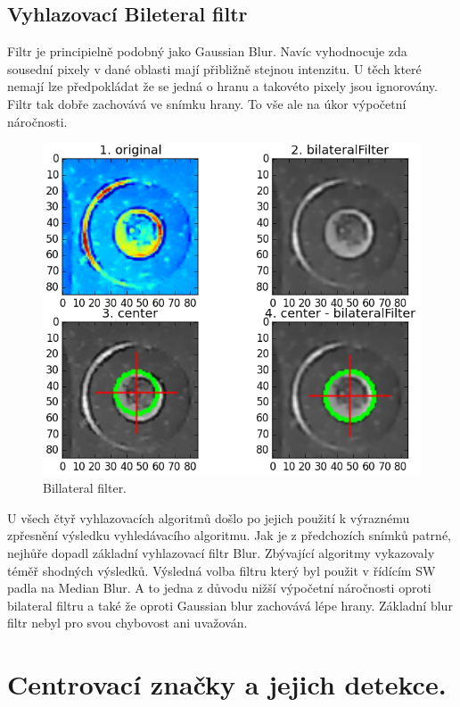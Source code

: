 \subsection{Vyhlazovací Bileteral filtr}

Filtr je principielně podobný jako Gaussian Blur. Navíc vyhodnocuje zda sousední pixely v dané oblasti mají přibližně stejnou intenzitu. U těch které nemají lze předpokládat že se jedná o hranu a takovéto pixely jsou ignorovány. Filtr tak dobře zachovává ve snímku hrany. To vše ale na úkor výpočetní náročnosti.

\begin{figure}[h!]
  \centering
    \includegraphics[width=0.8\linewidth]{obrazky/billateralFilter.png}%
    \caption{Billateral filter.}
    \label{fig:billateralfilter}
\end{figure}

U všech čtyř vyhlazovacích algoritmů došlo po jejich použití k výraznému zpřesnění výsledku vyhledávacího algoritmu. Jak je z předchozích snímků patrné, nejhůře dopadl základní vyhlazovací filtr Blur. Zbývající algoritmy vykazovaly téměř shodných výsledků. Výsledná volba filtru který byl použit v řídícím SW padla na Median Blur. A to jedna z důvodu nižší výpočetní náročnosti oproti bilateral filtru a také že oproti Gaussian blur zachovává lépe hrany. Základní blur filtr nebyl pro svou chybovost ani uvažován.


\section{Centrovací značky a jejich detekce.}

